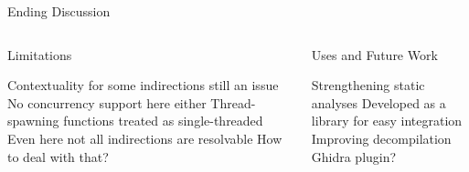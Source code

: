 \begin{frame}{Ending Discussion}
  \begin{columns}
    \begin{block}{Limitations}
      \begin{outline}
        \1 Contextuality for some indirections still an issue
        \1 No concurrency support here either
        \2 Thread-spawning functions treated as single-threaded
        \1 Even here not all indirections are resolvable
        \2 How to deal with that?
      \end{outline}
    \end{block}
    \pause
    \begin{block}{Uses and Future Work}
      \begin{outline}
        \1 Strengthening static analyses
        \2 Developed as a library for easy integration
        \1 Improving decompilation
        \2 Ghidra plugin?
      \end{outline}
    \end{block}
  \end{columns}
\end{frame}
